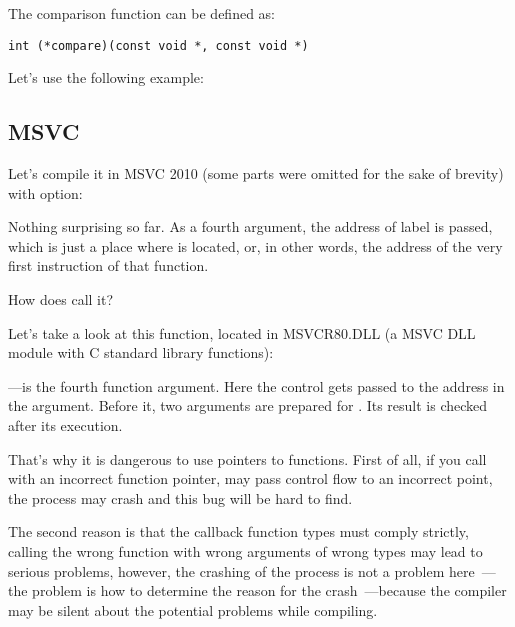 The comparison function can be defined as:

\begin{lstlisting}
int (*compare)(const void *, const void *)
\end{lstlisting}

Let's use the following example:



\subsection{MSVC}

Let's compile it in MSVC 2010 (some parts were omitted for the sake of brevity) with \TT{\Ox} option:



Nothing surprising so far.
As a fourth argument, the address of label  is passed, which is just a place
where \comp is located, or, in other words, the address of the very first instruction of 
that function.

How does \qsort call it?


Let's take a look at this function, located in MSVCR80.DLL (a MSVC DLL module with C standard library functions):



---is the fourth function argument.
Here the control gets passed to the address in the  argument.
Before it, two arguments are prepared for \comp. Its result is checked after its execution.

That's why it is dangerous to use pointers to functions.
First of all, if you call \qsort with an incorrect function pointer, \qsort may pass control flow
to an incorrect point, the process may crash and this bug will be hard to find.

The second reason is that the callback function types must comply strictly, calling the wrong function
with wrong arguments of wrong types may lead to serious problems, however, the crashing of the process is not a 
problem here~---the problem is how to determine the reason for the crash~---because the compiler may be 
silent about the potential problems while compiling.

